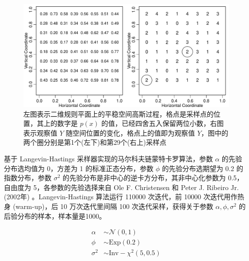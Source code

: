 \documentclass[12pt,a4paper,UTF8,twoside]{book}
\theoremstyle{definition}
\theoremstyle{definition}
\theoremstyle{definition}
\theoremstyle{remark}
\begin{document}
\begin{figure}

{\centering \includegraphics[width=0.9\linewidth]{figures/binom-without-nugget-geoRglm} 

}

\caption{左图表示二维规则平面上的平稳空间高斯过程，格点是采样点的位置，其上的数字是 $p(x)$ 的值，已经四舍五入保留两位小数，右图表示观察值 $Y$ 随空间位置的变化，格点上的值即为观察值 $Y$，图中的两个圈分别是第1个(左下)和第29个(右上)采样点}\label{fig:binom-without-nugget-geoRglm}
\end{figure}

基于 Langevin-Hastings 采样器实现的马尔科夫链蒙特卡罗算法，参数
\(\alpha\) 的先验分布选均值为 0，方差为 1 的标准正态分布，参数 \(\phi\)
的先验分布选期望为 0.2 的指数分布，参数 \(\sigma^2\)
的先验分布是非中心的逆卡方分布，其非中心化参数为 0.5，自由度为
5，各参数的先验选择来自 Ole F. Christensen 和 Peter J. Ribeiro Jr.
(2002年) \citep{geoRglm2002}。Langevin-Hastings 算法运行 110000
次迭代，前 10000 次迭代用作热身 (warm-up)，后 10 万次迭代里间隔 100
次迭代采样，获得关于参数 \(\alpha,\phi,\sigma^2\)
的后验分布的样本，样本量是1000。

\begin{align}
\alpha   & \sim \mathcal{N}(0,1) \\
\phi     & \sim \mathrm{Exp}(0.2) \\
\sigma^2 & \sim \mathrm{Inv-}\chi^2(5,0.5)
\end{align}
\end{document}
